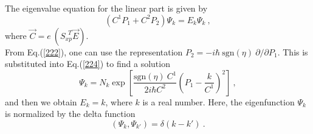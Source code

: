 \documentclass[a4paper,seceq]{ptptex}
\newcommand{\vecC}{ {\vec C} }
\newcommand{\sgn}{{\mbox{sgn}}}
\begin{document}
The eigenvalue equation for the linear part is given by
\begin{equation}
 \left( C^1P_1 + C^2P_2 \right) \Psi _k = E_k \Psi _k~,
\label{224}
\end{equation}
where $\vecC = e~(S_{xp}^{\ \ T}\vec{E})$. \\
From Eq.(\ref{222}), one can use the representation
$P_2=-i\hbar~\sgn(\eta)~ \partial/\partial P_1$.
This is substituted into Eq.(\ref{224}) to find a solution
\begin{equation}
 \Psi _k = N_k \exp\left[\frac{\sgn(\eta)~C^1}{2i\hbar C^2}
     \left(P_1-\frac{k}{C^1}\right)^2\right]~,
\label{225}
\end{equation}
and then we obtain $E_k=k$, where $k$ is a real number.
Here, the eigenfunction $\Psi _k$ is normalized by the delta function
\begin{equation}
 \left(\Psi _k, \Psi _{k'}\right) = \delta \left( k - k' \right)~.
\label{226}
\end{equation}
\end{document}
